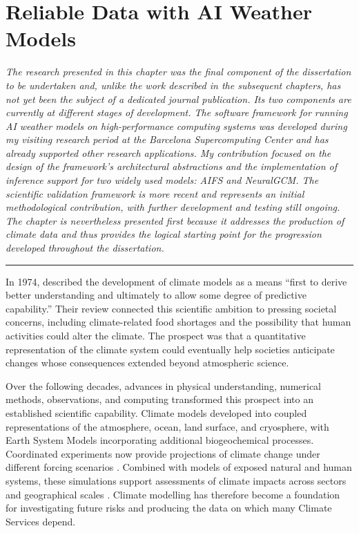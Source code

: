 \chapter{Reliable Data with AI Weather Models}

\ifpdf
    \graphicspath{{Chapter3/Figs/}{Chapter3/Figs/PDF/}{Chapter3/Figs/}}
\else
    \graphicspath{{Chapter3/Figs/Vector/}{Chapter3/Figs/}}
\fi

\noindent\textit{The research presented in this chapter was the final component of the dissertation to be undertaken and, unlike the work described in the subsequent chapters, has not yet been the subject of a dedicated journal publication. Its two components are currently at different stages of development. The software framework for running AI weather models on high-performance computing systems was developed during my visiting research period at the Barcelona Supercomputing Center and has already supported other research applications. My contribution focused on the design of the framework's architectural abstractions and the implementation of inference support for two widely used models: AIFS and NeuralGCM. The scientific validation framework is more recent and represents an initial methodological contribution, with further development and testing still ongoing. The chapter is nevertheless presented first because it addresses the production of climate data and thus provides the logical starting point for the progression developed throughout the dissertation.}

\vspace{0.5em}
\begin{center}
    \rule{0.5\textwidth}{0.4pt}
\end{center}
\vspace{0.5em}


In 1974, \citet{schneider_climate_1974} described the development of climate models as a means ``first to derive better understanding and ultimately to allow some degree of predictive capability.'' Their review connected this scientific ambition to pressing societal concerns, including climate-related food shortages and the possibility that human activities could alter the climate. The prospect was that a quantitative representation of the climate system could eventually help societies anticipate changes whose consequences extended beyond atmospheric science.

Over the following decades, advances in physical understanding, numerical methods, observations, and computing transformed this prospect into an established scientific capability. Climate models developed into coupled representations of the atmosphere, ocean, land surface, and cryosphere, with Earth System Models incorporating additional biogeochemical processes. Coordinated experiments now provide projections of climate change under different forcing scenarios \citep{eyring_overview_2016}. Combined with models of exposed natural and human systems, these simulations support assessments of climate impacts across sectors and geographical scales \citep{huber_climate_2014}. Climate modelling has therefore become a foundation for investigating future risks and producing the data on which many Climate Services depend.

